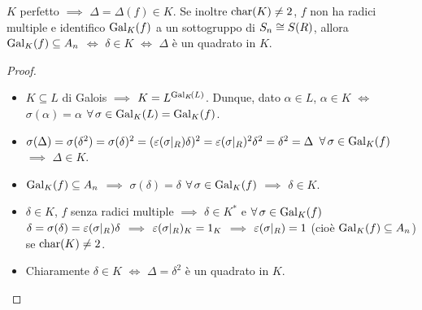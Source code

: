 \begin{prop}
$K$ perfetto $\implies$ $\Delta=\Delta(f)\in K$. Se inoltre $\car(K)\ne2$, $f$ non ha radici multiple e identifico $\Gal[K]{f}$ a un sottogruppo di $S_n\iso S(R)$, allora $\Gal[K]{f}\subseteq A_n$ $\iff$ $\delta\in K$ $\iff$ $\Delta$ è un quadrato in $K$.
\end{prop}
\begin{proof}
\begin{itemize}
\item $K\subseteq L$ di Galois $\implies$ $K=L^{\Gal[K]{L}}$. Dunque, dato $\alpha\in L$, $\alpha\in K$ $\iff$ $\sigma(\alpha)=\alpha$ $\all\sigma\in\Gal[K]{L}=\Gal[K]{f}$.
\item $\sigma(\Delta)=\sigma(\delta^2)=\sigma(\delta)^2=(\varepsilon(\sigma\rest{R})\delta)^2=\varepsilon(\sigma\rest{R})^2\delta^2=\delta^2=\Delta$ $\all\sigma\in\Gal[K]{f}$ $\implies$ $\Delta\in K$.
\item $\Gal[K]{f}\subseteq A_n$ $\implies$ $\sigma(\delta)=\delta$ $\all\sigma\in\Gal[K]{f}$ $\implies$ $\delta\in K$.
\item $\delta\in K$, $f$ senza radici multiple $\implies$ $\delta\in K^*$ e $\all\sigma\in\Gal[K]{f}$ $\delta=\sigma(\delta)=\varepsilon(\sigma\rest{R})\delta$ $\implies$ $\varepsilon(\sigma\rest{R})_K=1_K$ $\implies$ $\varepsilon(\sigma\rest{R})=1$ (cioè $\Gal[K]{f}\subseteq A_n$) se $\car(K)\ne2$.
\item Chiaramente $\delta\in K$ $\iff$ $\Delta=\delta^2$ è un quadrato in $K$.
\end{itemize}
\end{proof}



